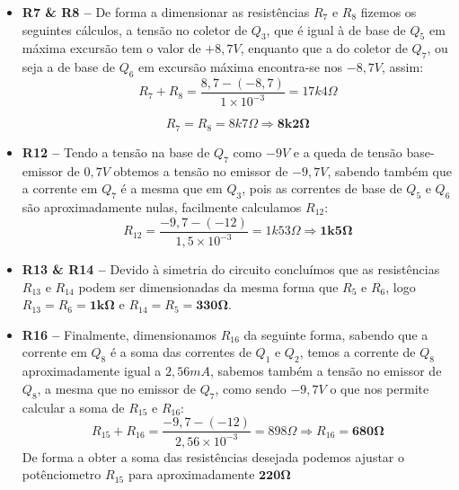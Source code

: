 \documentclass[a4paper]{article}
\begin{document}
\begin{itemize}
            \item \textbf{R7 \& R8 --} De forma a dimensionar as resistências $R_7$ e $R_8$ fizemos os seguintes cálculos, a tensão no coletor de $Q_3$, que é igual à de base de $Q_5$ em máxima excursão tem o valor de $+8,7V$, enquanto que a do coletor de $Q_7$, ou seja a de base de $Q_6$ em excursão máxima encontra-se nos $-8,7V$, assim:
            $$R_7 + R_8 = \frac{8,7 - (-8,7)}{1\times10^{-3}} = 17k4\Omega$$
            
            $$R_7 = R_8 = 8k7\Omega \Rightarrow \bm{8k2\Omega}$$
            
            \item \textbf{R12 --} Tendo a tensão na base de $Q_7$ como $-9V$ e a queda de tensão base-emissor de $0,7V$ obtemos a tensão no emissor de $-9,7V$, sabendo também que a corrente em $Q_7$ é a mesma que em $Q_3$, pois as correntes de base de $Q_5$ e $Q_6$ são aproximadamente nulas, facilmente calculamos $R_{12}$:
            $$R_{12} = \frac{-9,7 - (-12)}{1,5\times10^{-3}} = 1k53\Omega \Rightarrow \bm{1k5\Omega}$$
            
            \item \textbf{R13 \& R14 --} Devido à simetria do circuito concluímos que as resistências $R_{13}$ e $R_{14}$ podem ser dimensionadas da mesma forma que $R_5$ e $R_6$, logo $R_{13} = R_6 = \bm{1k\Omega}$ e $R_{14} = R_5 = \bm{330\Omega}$.\\
            
            \item \textbf{R16 --} Finalmente, dimensionamos $R_{16}$ da seguinte forma, sabendo que a corrente em $Q_8$ é a soma das correntes de $Q_1$ e $Q_2$, temos a corrente de $Q_8$ aproximadamente igual a $2,56mA$, sabemos também a tensão no emissor de $Q_8$, a mesma que no emissor de $Q_7$, como sendo $-9,7V$ o que nos permite calcular a soma de $R_{15}$ e $R_{16}$:
            $$R_{15} + R_{16} = \frac{-9,7 - (-12)}{2,56\times10^{-3}} = 898\Omega \Rightarrow R_{16} = \bm{680\Omega}$$
            De forma a obter a soma das resistências desejada podemos ajustar o potênciometro $R_{15}$ para aproximadamente $\bm{220\Omega}$\\
            \smallskip
        \end{itemize}
        
\end{document}
